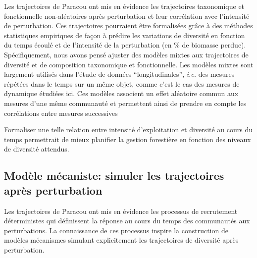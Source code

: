 \documentclass[
  11pt,
  french,
  A4paper,
  extrafontsizes,onecolumn,openright
  ]{memoir}
\begin{document}
Les trajectoires de Paracou ont mis en évidence les trajectoires
taxonomique et fonctionnelle non-aléatoires après perturbation et leur
corrélation avec l'intensité de perturbation. Ces trajectoires
pourraient être formalisées grâce à des méthodes statistiques empiriques
de façon à prédire les variations de diversité en fonction du temps
écoulé et de l'intensité de la perturbation (en \% de biomasse perdue).
Spécifiquement, nous avons pensé ajuster des modèles mixtes aux
trajectoires de diversité et de composition taxonomique et
fonctionnelle. Les modèles mixtes sont largement utilisés dans l'étude
de données ``longitudinales'', \emph{i.e.} des mesures répétées dans le
temps sur un même objet, comme c'est le cas des mesures de dynamique
étudiées ici. Ces modèles associent un effet aléatoire commun aux
mesures d'une même communauté et permettent ainsi de prendre en compte
les corrélations entre mesures successives

Formaliser une telle relation entre intensité d'exploitation et
diversité au cours du temps permettrait de mieux planifier la gestion
forestière en fonction des niveaux de diversité attendus.

\subsection{Modèle mécaniste: simuler les trajectoires après
perturbation}\label{modele-mecaniste-simuler-les-trajectoires-apres-perturbation}

Les trajectoires de Paracou ont mis en évidence les processus de
recrutement déterministes qui définissent la réponse au cours du temps
des communautés aux perturbations. La connaissance de ces processus
inspire la construction de modèles mécanismes simulant explicitement les
trajectoires de diversité après perturbation.
\end{document}
